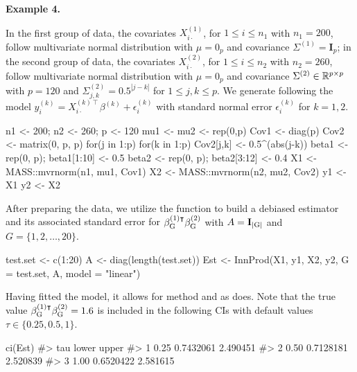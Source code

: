 \noindent\textbf{Example 4.}
{In the first group of data, the covariates $X_{i\cdot}^{(1)}$, for $1 \leq i \leq n_1$ with $n_1 = 200$, follow multivariate normal distribution with $\mu = 0_p$ and covariance $\Sigma^{(1)}=\mathbf{I}_p$; in the second group of data, the covariates $X_{i\cdot}^{(2)}$, for $1 \leq i \leq n_2$ with $n_2 = 260$, follow multivariate normal distribution with $\mu=0_p$ and covariance $\Sigma^{(2)} \in \mathbb{R}^{p\times p}$ with $p = 120$ and $\Sigma^{(2)}_{j,k} = 0.5^{|j-k|}$  for $1 \leq j, k \leq p$. 
We generate following the model $y_i^{(k)} = X_{i\cdot}^{(k)\intercal}\beta^{(k)} + \epsilon_i^{(k)}$ with standard normal error $\epsilon_i^{(k)}$ for $k=1,2$.
\begin{example}
    n1 <- 200; n2 <- 260; p <- 120
    mu1 <- mu2 <- rep(0,p)
    Cov1 <- diag(p)
    Cov2 <- matrix(0, p, p)
    for(j in 1:p) for(k in 1:p) Cov2[j,k] <- 0.5^(abs(j-k))
    beta1 <- rep(0, p); beta1[1:10] <- 0.5
    beta2 <- rep(0, p); beta2[3:12] <- 0.4
    X1 <- MASS::mvrnorm(n1, mu1, Cov1)
    X2 <- MASS::mvrnorm(n2, mu2, Cov2)
    y1 <- X1%
    y2 <- X2%
\end{example}
After preparing the data, we utilize the  function to build a debiased estimator and its associated standard error for {$\beta_{\mathrm{G}}^{(1)\intercal}\beta_{\mathrm{G}}^{(2)}$ with $A=\mathbf{I}_{|\mathrm{G}|}$ and $G = \{1,2,\ldots,20\}$}.%
\begin{example}
    test.set <- c(1:20)
    A <- diag(length(test.set))
    Est <- InnProd(X1, y1, X2, y2, G = test.set, A, model = "linear")
\end{example}
Having fitted the model, it allows for method  and  as  does. Note that the true value $\beta^{(1)\intercal}_{\mathrm{G}} \beta^{(2)}_{\mathrm{G}} = 1.6$ is included in the following CIs with default values $\tau\in \{0.25, 0.5, 1\}$.
\begin{example}
    ci(Est)
    #>    tau     lower    upper
    #> 1 0.25 0.7432061 2.490451
    #> 2 0.50 0.7128181 2.520839
    #> 3 1.00 0.6520422 2.581615
\end{example}
} 

